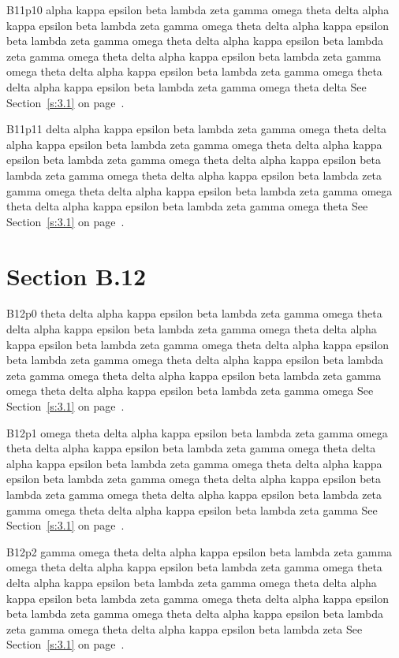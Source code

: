 B11p10 alpha kappa epsilon beta lambda zeta gamma omega theta delta alpha kappa epsilon beta lambda zeta gamma omega theta delta alpha kappa epsilon beta lambda zeta gamma omega theta delta alpha kappa epsilon beta lambda zeta gamma omega theta delta alpha kappa epsilon beta lambda zeta gamma omega theta delta alpha kappa epsilon beta lambda zeta gamma omega theta delta alpha kappa epsilon beta lambda zeta gamma omega theta delta See Section~\ref{s:3.1} on page~\pageref{s:3.1}.

B11p11 delta alpha kappa epsilon beta lambda zeta gamma omega theta delta alpha kappa epsilon beta lambda zeta gamma omega theta delta alpha kappa epsilon beta lambda zeta gamma omega theta delta alpha kappa epsilon beta lambda zeta gamma omega theta delta alpha kappa epsilon beta lambda zeta gamma omega theta delta alpha kappa epsilon beta lambda zeta gamma omega theta delta alpha kappa epsilon beta lambda zeta gamma omega theta See Section~\ref{s:3.1} on page~\pageref{s:3.1}.

\section{Section B.12}\label{s:B.12}
B12p0 theta delta alpha kappa epsilon beta lambda zeta gamma omega theta delta alpha kappa epsilon beta lambda zeta gamma omega theta delta alpha kappa epsilon beta lambda zeta gamma omega theta delta alpha kappa epsilon beta lambda zeta gamma omega theta delta alpha kappa epsilon beta lambda zeta gamma omega theta delta alpha kappa epsilon beta lambda zeta gamma omega theta delta alpha kappa epsilon beta lambda zeta gamma omega See Section~\ref{s:3.1} on page~\pageref{s:3.1}.

B12p1 omega theta delta alpha kappa epsilon beta lambda zeta gamma omega theta delta alpha kappa epsilon beta lambda zeta gamma omega theta delta alpha kappa epsilon beta lambda zeta gamma omega theta delta alpha kappa epsilon beta lambda zeta gamma omega theta delta alpha kappa epsilon beta lambda zeta gamma omega theta delta alpha kappa epsilon beta lambda zeta gamma omega theta delta alpha kappa epsilon beta lambda zeta gamma See Section~\ref{s:3.1} on page~\pageref{s:3.1}.

B12p2 gamma omega theta delta alpha kappa epsilon beta lambda zeta gamma omega theta delta alpha kappa epsilon beta lambda zeta gamma omega theta delta alpha kappa epsilon beta lambda zeta gamma omega theta delta alpha kappa epsilon beta lambda zeta gamma omega theta delta alpha kappa epsilon beta lambda zeta gamma omega theta delta alpha kappa epsilon beta lambda zeta gamma omega theta delta alpha kappa epsilon beta lambda zeta See Section~\ref{s:3.1} on page~\pageref{s:3.1}.

